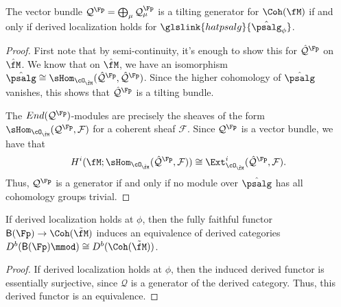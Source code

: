 \begin{lemma}\label{lem:tiling-localization}
The vector bundle $\mathcal{Q}^{\Fp}=\bigoplus_{\mu}\mathcal{Q}_\mu^{\Fp}$ is a tilting generator for $\Coh(\fM)$ if and only if derived localization holds for $\glslink{hatpsalg}{\hat{\psalg}_\phi}$.  
\end{lemma}
\begin{proof}
First note that  by semi-continuity, it's enough to show this for $\mathcal{\hat Q}^{\Fp}$ on $\hat{\fM}$.  We know that on $\hat{\fM}$, we have an isomorphism $\hat{\psalg}\cong \sHom_{\cO_{\hat{\fM}}}(\mathcal{\hat Q}^{\Fp},\mathcal{\hat Q}^{\Fp})$.  Since the higher cohomology of $\hat{\psalg}$ vanishes, this shows that $\mathcal{\hat Q}^{\Fp}$ is a tilting bundle.  

The $End(\mathcal{Q}^{\Fp})$-modules are precisely the sheaves of the form $\sHom_{\cO_{\hat{\fM}}}(\mathcal{Q}^{\Fp},\mathcal{F})$ for a coherent sheaf $\mathcal{F}$. Since $\mathcal{Q}^{\Fp}$ is a vector bundle, we have that \[H^i(\fM;\sHom_{\cO_{\hat{\fM}}}(\mathcal{\hat Q}^{\Fp},\mathcal{F}))\cong \Ext^i_{\cO_{\hat{\fM}}}(\mathcal{\hat Q}^{\Fp},\mathcal{F}).\] Thus, $\mathcal{Q}^{\Fp}$ is a generator if and only if no module over $\hat{\psalg}$ has all cohomology groups trivial.   
\end{proof}

\begin{corollary} 
If derived localization holds at $\phi$, then the fully faithful functor  $\mathsf{B}(\Fp)\to \Coh(\tilde{\fM})$  induces an equivalence of derived categories $D^b(\mathsf{B}(\Fp)\mmod)\cong D^b(\Coh(\tilde{\fM}))$.
\end{corollary}
\begin{proof}
  If derived localization holds at $\phi$, then the induced derived functor is essentially surjective, since $\mathcal{Q}$ is a generator of the derived category.  Thus, this derived functor is an equivalence. 
\end{proof}

